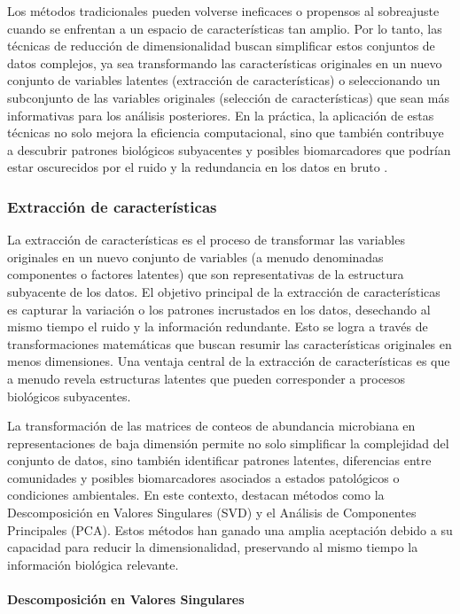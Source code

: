 Los métodos tradicionales pueden volverse ineficaces o propensos al sobreajuste cuando se enfrentan a un espacio de características tan amplio. Por lo tanto, las técnicas de reducción de dimensionalidad buscan simplificar estos conjuntos de datos complejos, ya sea transformando las características originales en un nuevo conjunto de variables latentes (extracción de características) o seleccionando un subconjunto de las variables originales (selección de características) que sean más informativas para los análisis posteriores. En la práctica, la aplicación de estas técnicas no solo mejora la eficiencia computacional, sino que también contribuye a descubrir patrones biológicos subyacentes y posibles biomarcadores que podrían estar oscurecidos por el ruido y la redundancia en los datos en bruto \cite{guyon2003introduction}.



\subsubsection{Extracción de características}

La extracción de características es el proceso de transformar las variables originales en un nuevo conjunto de variables (a menudo denominadas componentes o factores latentes) que son representativas de la estructura subyacente de los datos. El objetivo principal de la extracción de características es capturar la variación o los patrones incrustados en los datos, desechando al mismo tiempo el ruido y la información redundante. Esto se logra a través de transformaciones matemáticas que buscan resumir las características originales en menos dimensiones. Una ventaja central de la extracción de características es que a menudo revela estructuras latentes que pueden corresponder a procesos biológicos subyacentes.


La transformación de las matrices de conteos de abundancia microbiana en representaciones de baja dimensión permite no solo simplificar la complejidad del conjunto de datos, sino también identificar patrones latentes, diferencias entre comunidades y posibles biomarcadores asociados a estados patológicos o condiciones ambientales. En este contexto, destacan métodos como la Descomposición en Valores Singulares (SVD) y el Análisis de Componentes Principales (PCA). Estos métodos han ganado una amplia aceptación debido a su capacidad para reducir la dimensionalidad, preservando al mismo tiempo la información biológica relevante.

\paragraph{Descomposición en Valores Singulares}

